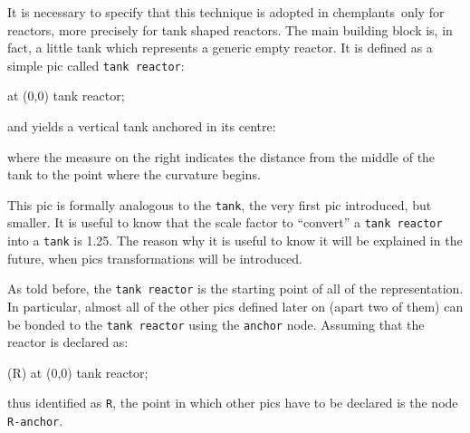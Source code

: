 \documentclass[12pt]{article}						%
\newcommand*{\chpn}[1]{\texttt{#1}}				%
\newcommand*{\chpp}[1]{\texttt{#1}}				%
\newcommand*{\chemplants}{chemplants}
\begin{document}
It is necessary to specify that this technique is adopted in \chemplants\ only
for reactors, more precisely for tank shaped reactors. The main building block
is, in fact, a little tank which represents a generic empty reactor. It is
defined as a simple pic called \chpp{tank reactor}:
\begin{chpcode}
	\pic at (0,0) {tank reactor};
\end{chpcode}
and yields a vertical tank anchored in its centre:
\begin{center}
\end{center}
where the measure on the right indicates the distance from the middle of the tank
to the point where the curvature begins.

This pic is formally analogous to the \chpp{tank}, the very first pic
introduced, but smaller. It is useful to know that the scale factor to
``convert'' a \chpp{tank reactor} into a \chpp{tank} is \num{1.25}. The reason
why it is useful to know it will be explained in the future, when pics
transformations will be introduced.

As told before, the \chpp{tank reactor} is the starting point of all of the
representation. In particular, almost all of the other pics defined later on
(apart two of them) can be bonded to the \chpp{tank reactor} using the
\chpn{anchor} node. Assuming that the reactor is declared as:
\begin{chpcode}
	\pic (R) at (0,0) {tank reactor};
\end{chpcode}
thus identified as \chpn{R}, the point in which other pics have to be declared
is the node \chpn{R-anchor}.
\end{document}
